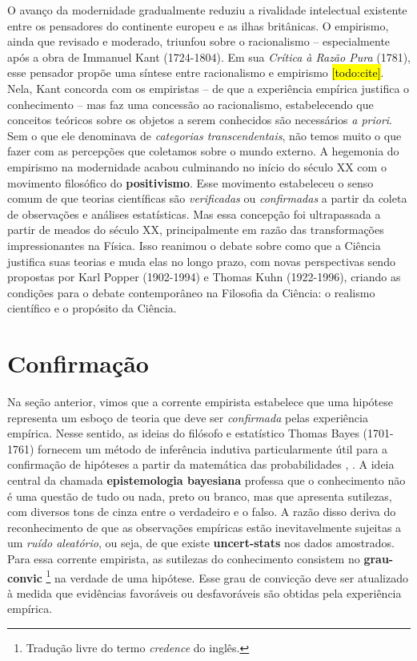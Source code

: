 \documentclass[./main.tex]{subfiles}
\begin{document}
\par O avanço da modernidade gradualmente reduziu a rivalidade intelectual existente entre os pensadores do continente europeu e as ilhas britânicas. O empirismo, ainda que revisado e moderado, triunfou sobre o racionalismo -- especialmente após a obra de Immanuel Kant (1724-1804). Em sua \textit{Crítica à Razão Pura} (1781), esse pensador propõe uma síntese entre racionalismo e empirismo \hl{[todo:cite]}. Nela, Kant concorda com os empiristas -- de que a experiência empírica justifica o conhecimento -- mas faz uma concessão ao racionalismo, estabelecendo que conceitos teóricos sobre os objetos a serem conhecidos são necessários \textit{a priori}. Sem o que ele denominava de \textit{categorias transcendentais}, não temos muito o que fazer com as percepções que coletamos sobre o mundo externo. A hegemonia do empirismo na modernidade  acabou culminando no início do século XX com o movimento filosófico do \textbf{\gls{positivismo}}. Esse movimento estabeleceu o senso comum de que teorias científicas são \textit{verificadas} ou \textit{confirmadas} a partir da coleta de observações e análises estatísticas. Mas essa concepção foi ultrapassada a partir de meados do século XX, principalmente em razão das transformações impressionantes na Física. Isso reanimou o debate sobre como que a Ciência justifica suas teorias e muda elas no longo prazo, com novas perspectivas sendo propostas por Karl Popper (1902-1994) e Thomas Kuhn (1922-1996), criando as condições para o debate contemporâneo na Filosofia da Ciência: o realismo científico e o propósito da Ciência.

\section{Confirmação} \label{sec:epis:bayes}

\par Na seção anterior, vimos que a corrente empirista estabelece que uma hipótese representa um esboço de teoria que deve ser \textit{confirmada} pelas experiência empírica. Nesse sentido, as ideias do filósofo e estatístico Thomas Bayes (1701-1761) fornecem um método de inferência indutiva particularmente útil para a confirmação de hipóteses a partir da matemática das probabilidades \cite{sep-epistemology-bayesian}, \cite{sprenger2019}. A ideia central da chamada \textbf{epistemologia bayesiana} professa que o conhecimento não é uma questão de tudo ou nada, preto ou branco, mas que apresenta sutilezas, com diversos tons de cinza entre o verdadeiro e o falso. A razão disso deriva do reconhecimento de que as observações empíricas estão inevitavelmente sujeitas a um \textit{ruído aleatório}, ou seja, de que existe \textbf{\gls{uncert-stats}} nos dados amostrados. Para essa corrente empirista, as sutilezas do conhecimento consistem no \textbf{\gls{grau-convic}} \footnote{Tradução livre do termo \textit{credence} do inglês.} na verdade de uma hipótese. Esse grau de convicção deve ser atualizado à medida que evidências favoráveis ou desfavoráveis são obtidas pela experiência empírica. 
\end{document}
